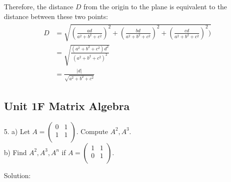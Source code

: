 \documentclass{article}
\begin{document}
Therefore, the distance $D$ from the origin to the plane is equivalent to the 
distance between these two points:
\begin{gather*}
  \begin{split}
    D &= \sqrt{(\frac{ad}{a^2 + b^2 + c^2})^2 + (\frac{bd}{a^2 + b^2 + c^2})^2 + (\frac{cd}{a^2 + b^2 + c^2})^2)} \\
      &= \sqrt{\frac{(a^2 + b^2 + c^2)d^2}{(a^2 + b^2 + c^2)^2}} \\
      &= \frac{|d|}{\sqrt{a^2 + b^2 + c^2}}
  \end{split}
\end{gather*}

\subsection*{Unit 1F Matrix Algebra}

5. a) Let $A = \begin{pmatrix}
                 0 & 1 \\
                 1 & 1 \\ 
               \end{pmatrix}$. Compute $A^2, A^3$. \\
b) Find $A^2, A^3, A^n$ if $A = \begin{pmatrix}
                                  1 & 1 \\
                                  0 & 1 \\ 
                                \end{pmatrix}$.

Solution:
\end{document}
